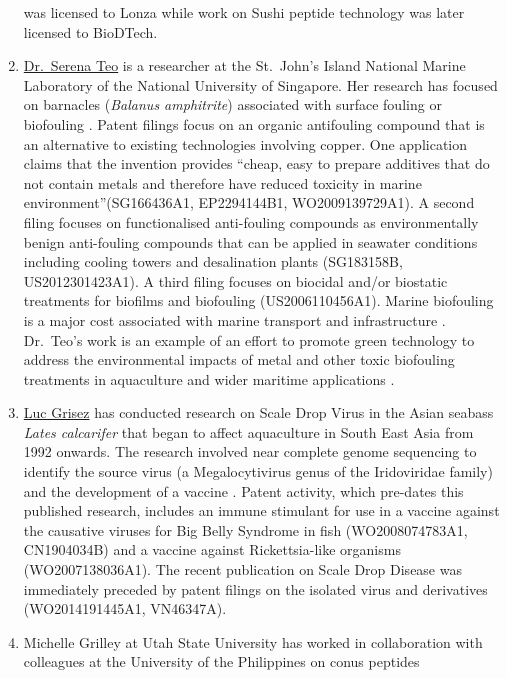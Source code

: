 \documentclass[]{book}
\theoremstyle{definition}
\theoremstyle{definition}
\theoremstyle{definition}
\theoremstyle{remark}
\begin{document}
\begin{enumerate}
  was licensed to Lonza while work on Sushi peptide technology was later
  licensed to BioDTech.
\item
  \href{http://sjinml.nus.edu.sg/profile-serena-teo/}{Dr.~Serena Teo} is
  a researcher at the St.~John's Island National Marine Laboratory of
  the National University of Singapore. Her research has focused on
  barnacles (\emph{Balanus amphitrite}) associated with surface fouling
  or biofouling \citep{Phang_2009, Guo_2011, Petrone_2013}. Patent
  filings focus on an organic antifouling compound that is an
  alternative to existing technologies involving copper. One application
  claims that the invention provides ``cheap, easy to prepare additives
  that do not contain metals and therefore have reduced toxicity in
  marine environment''(SG166436A1, EP2294144B1, WO2009139729A1). A
  second filing focuses on functionalised anti-fouling compounds as
  environmentally benign anti-fouling compounds that can be applied in
  seawater conditions including cooling towers and desalination plants
  (SG183158B, US2012301423A1). A third filing focuses on biocidal and/or
  biostatic treatments for biofilms and biofouling (US2006110456A1).
  Marine biofouling is a major cost associated with marine transport and
  infrastructure \citep{Callow_2011}. Dr.~Teo's work is an example of an
  effort to promote green technology to address the environmental
  impacts of metal and other toxic biofouling treatments in aquaculture
  and wider maritime applications \citep{Callow_2011, Floerl_2016}.
\item
  \href{https://nl.linkedin.com/in/luc-grisez-981a455}{Luc Grisez} has
  conducted research on Scale Drop Virus in the Asian seabass
  \emph{Lates calcarifer} that began to affect aquaculture in South East
  Asia from 1992 onwards. The research involved near complete genome
  sequencing to identify the source virus (a Megalocytivirus genus of
  the Iridoviridae family) and the development of a vaccine
  \citep{de_Groof_2015}. Patent activity, which pre-dates this published
  research, includes an immune stimulant for use in a vaccine against
  the causative viruses for Big Belly Syndrome in fish (WO2008074783A1,
  CN1904034B) and a vaccine against Rickettsia-like organisms
  (WO2007138036A1). The recent publication on Scale Drop Disease was
  immediately preceded by patent filings on the isolated virus and
  derivatives (WO2014191445A1, VN46347A).
\item
  Michelle Grilley at Utah State University has worked in collaboration
  with colleagues at the University of the Philippines on conus peptides

\end{enumerate}
\end{document}
